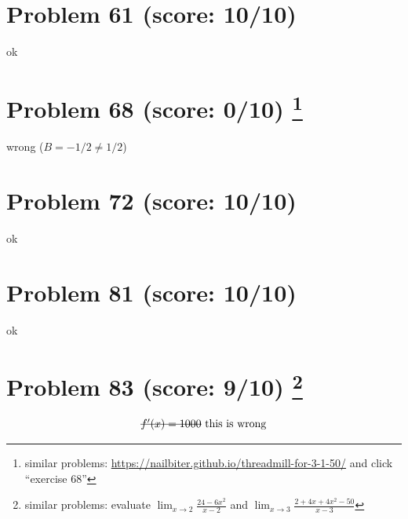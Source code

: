 \documentclass[10pt]{article} %
\begin{document}
\section*{Problem 61 (score: 10/10)}
ok
\section*{Problem 68 (score: 0/10) \footnote{similar problems: \url{https://nailbiter.github.io/threadmill-for-3-1-50/} and click ``exercise 68''}}
wrong ($B=-1/2\neq1/2$)
\section*{Problem 72 (score: 10/10)}
ok
\section*{Problem 81 (score: 10/10)}
ok
\section*{Problem 83 (score: 9/10) \footnote{similar problems: evaluate $\lim_{x\to2}\frac{24-6x^2}{x-2}$ and 
$\lim_{x\to3}\frac{2+4x+4x^2-50}{x-3}$}}
\begin{equation*}
	\mbox{\sout{$f'(x)=1000$} this is wrong}
\end{equation*}
\end{document}
